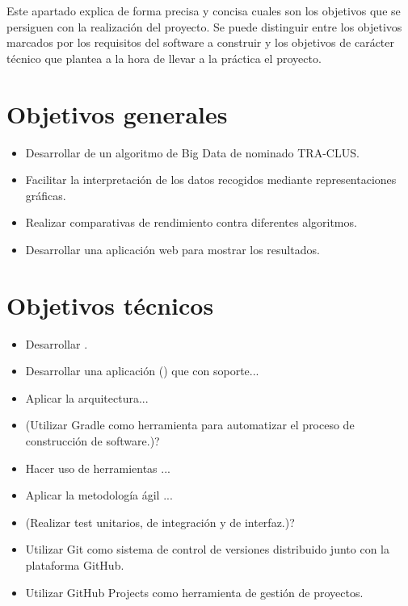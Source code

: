 
Este apartado explica de forma precisa y concisa cuales son los objetivos que se persiguen con la realización del proyecto. Se puede distinguir entre los objetivos marcados por los requisitos del software a construir y los objetivos de carácter técnico que plantea a la hora de llevar a la práctica el proyecto.

\section{Objetivos generales}\label{objetivos-generales}

\begin{itemize}
\tightlist
\item
  Desarrollar de un algoritmo de Big Data de nominado TRA-CLUS.
\item
  Facilitar la interpretación de los datos recogidos mediante
  representaciones gráficas.
\item
  Realizar comparativas de rendimiento contra diferentes algoritmos.
\item
  Desarrollar una aplicación web para mostrar los resultados.
\end{itemize}

\section{Objetivos técnicos}\label{objetivos-tecnicos}

\begin{itemize}
\tightlist
\item
  Desarrollar .
\item
  Desarrollar una aplicación () que con soporte...
\item
  Aplicar la arquitectura...
\item
  (Utilizar Gradle como herramienta para automatizar el proceso de
  construcción de software.)?
\item
  Hacer uso de herramientas ...
\item
  Aplicar la metodología ágil ...
\item
  (Realizar test unitarios, de integración y de interfaz.)?
\item
  Utilizar Git como sistema de control de versiones distribuido junto
  con la plataforma GitHub.
\item
  Utilizar GitHub Projects como herramienta de gestión de proyectos.
\end{itemize}

